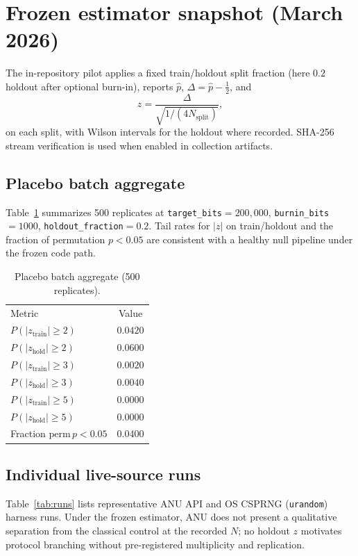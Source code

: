 \documentclass[reprint,amsmath,amssymb,aps,showkeys]{revtex4-2}
\begin{document}
\section{Frozen estimator snapshot (March 2026)}
The in-repository pilot applies a fixed train/holdout split fraction (here $0.2$ holdout after optional burn-in), reports $\hat p$, $\Delta=\hat p-\tfrac12$, and
\begin{equation}
z = \frac{\Delta}{\sqrt{1/(4N_{\mathrm{split}})}},
\end{equation}
on each split, with Wilson intervals for the holdout where recorded. SHA-256 stream verification is used when enabled in collection artifacts.

\subsection{Placebo batch aggregate}
Table~\ref{tab:placebo} summarizes 500 replicates at \texttt{target\_bits}${}=200{,}000$, \texttt{burnin\_bits}${}=1000$, \texttt{holdout\_fraction}${}=0.2$. Tail rates for $|z|$ on train/holdout and the fraction of permutation $p<0.05$ are consistent with a healthy null pipeline under the frozen code path.

\begin{table}[t]
\caption{Placebo batch aggregate (500 replicates).}
\label{tab:placebo}
\begin{ruledtabular}
\begin{tabular}{lc}
Metric & Value \\
\colrule
$P(|z_{\mathrm{train}}|\ge 2)$ & $0.0420$ \\
$P(|z_{\mathrm{hold}}|\ge 2)$ & $0.0600$ \\
$P(|z_{\mathrm{train}}|\ge 3)$ & $0.0020$ \\
$P(|z_{\mathrm{hold}}|\ge 3)$ & $0.0040$ \\
$P(|z_{\mathrm{train}}|\ge 5)$ & $0.0000$ \\
$P(|z_{\mathrm{hold}}|\ge 5)$ & $0.0000$ \\
Fraction $\mathrm{perm}\,p<0.05$ & $0.0400$ \\
\end{tabular}
\end{ruledtabular}
\end{table}

\subsection{Individual live-source runs}
Table~\ref{tab:runs} lists representative ANU API and OS CSPRNG (\texttt{urandom}) harness runs. Under the frozen estimator, ANU does not present a qualitative separation from the classical control at the recorded $N$; no holdout $z$ motivates protocol branching without pre-registered multiplicity and replication.
\end{document}
